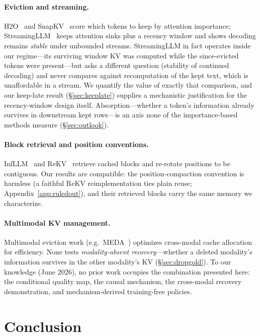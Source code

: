\documentclass{article} %
\begin{document}
\paragraph{Eviction and streaming.}
H2O~\citep{h2o} and SnapKV~\citep{snapkv} score which tokens to keep by attention importance; StreamingLLM~\citep{streamingllm} keeps attention sinks plus a recency window and shows decoding remains \emph{stable} under unbounded streams. StreamingLLM in fact operates inside our regime---its surviving window KV was computed while the since-evicted tokens were present---but asks a different question (stability of continued decoding) and never compares against recomputation of the kept text, which is unaffordable in a stream. We quantify the value of exactly that comparison, and our keep-late result (\S\ref{sec:keeplate}) supplies a mechanistic justification for the recency-window design itself. Absorption---whether a token's information already survives in downstream kept rows---is an axis none of the importance-based methods measure (\S\ref{sec:outlook}).

\paragraph{Block retrieval and position conventions.}
InfLLM~\citep{infllm} and ReKV~\citep{rekv} retrieve cached blocks and re-rotate positions to be contiguous. Our results are compatible: the position-compaction convention is harmless (a faithful ReKV reimplementation ties plain reuse; Appendix~\ref{app:ruledout}), and their retrieved blocks carry the same memory we characterize.

\paragraph{Multimodal KV management.}
Multimodal eviction work (e.g.\ MEDA~\citep{meda}) optimizes cross-modal cache allocation for efficiency. None tests \emph{modality-absent recovery}---whether a deleted modality's information survives in the other modality's KV (\S\ref{sec:dropgold}). To our knowledge (June 2026), no prior work occupies the combination presented here: the conditional quality map, the causal mechanism, the cross-modal recovery demonstration, and mechanism-derived training-free policies.

\section{Conclusion}
\end{document}
